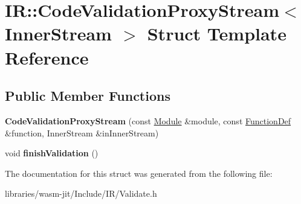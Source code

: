 \hypertarget{struct_i_r_1_1_code_validation_proxy_stream}{}\section{IR\+:\+:Code\+Validation\+Proxy\+Stream$<$ Inner\+Stream $>$ Struct Template Reference}
\label{struct_i_r_1_1_code_validation_proxy_stream}
\subsection*{Public Member Functions}
\begin{DoxyCompactItemize}
\item 
\mbox{\label{struct_i_r_1_1_code_validation_proxy_stream_ac7481aea51d9dd38c69881c38bf82db0}} 
{\bfseries Code\+Validation\+Proxy\+Stream} (const \mbox{\hyperlink{struct_i_r_1_1_module}{Module}} \&module, const \mbox{\hyperlink{struct_i_r_1_1_function_def}{Function\+Def}} \&function, Inner\+Stream \&in\+Inner\+Stream)
\item 
\mbox{\label{struct_i_r_1_1_code_validation_proxy_stream_af5faff2a07a2acdb1a678bddc244c2ac}} 
void {\bfseries finish\+Validation} ()
\end{DoxyCompactItemize}


The documentation for this struct was generated from the following file\+:\begin{DoxyCompactItemize}
\item 
libraries/wasm-\/jit/\+Include/\+I\+R/Validate.\+h\end{DoxyCompactItemize}
